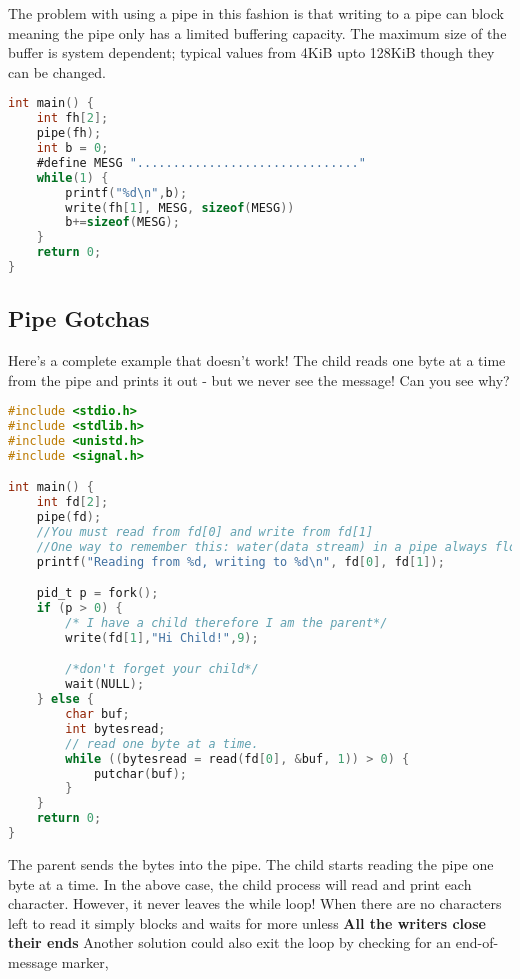 The problem with using a pipe in this fashion is that writing to a pipe can block meaning the pipe only has a limited buffering capacity.
The maximum size of the buffer is system dependent; typical values from 4KiB upto 128KiB though they can be changed.

\begin{lstlisting}[language=C]
int main() {
    int fh[2];
    pipe(fh);
    int b = 0;
    #define MESG "..............................."
    while(1) {
        printf("%d\n",b);
        write(fh[1], MESG, sizeof(MESG))
        b+=sizeof(MESG);
    }
    return 0;
}
\end{lstlisting}

\subsection{Pipe Gotchas}

Here's a complete example that doesn't work! The child reads one byte at a time from the pipe and prints it out - but we never see the message! Can you see why?

\begin{lstlisting}[language=C]
#include <stdio.h>
#include <stdlib.h>
#include <unistd.h>
#include <signal.h>

int main() {
    int fd[2];
    pipe(fd);
    //You must read from fd[0] and write from fd[1]
    //One way to remember this: water(data stream) in a pipe always flows from a higher place(1) to a lower place(0)
    printf("Reading from %d, writing to %d\n", fd[0], fd[1]);

    pid_t p = fork();
    if (p > 0) {
        /* I have a child therefore I am the parent*/
        write(fd[1],"Hi Child!",9);

        /*don't forget your child*/
        wait(NULL);
    } else {
        char buf;
        int bytesread;
        // read one byte at a time.
        while ((bytesread = read(fd[0], &buf, 1)) > 0) {
            putchar(buf);
        }
    }
    return 0;
}
\end{lstlisting}

The parent sends the bytes  into the pipe.
The child starts reading the pipe one byte at a time.
In the above case, the child process will read and print each character.
However, it never leaves the while loop!
When there are no characters left to read it simply blocks and waits for more unless \textbf{All the writers close their ends}
Another solution could also exit the loop by checking for an end-of-message marker,

